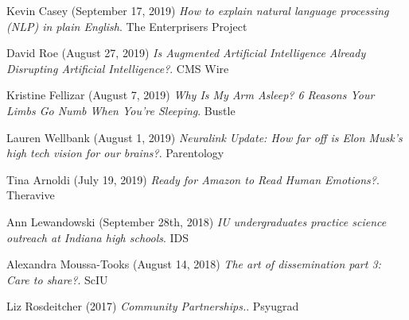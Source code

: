 \documentclass[10pt]{cooperCV2}
\begin{document}
\begin{etaremune}[itemindent=-1.5\bibhang, topsep=0pt,
				   itemsep=\bibsep,partopsep=0pt,parsep=0pt,leftmargin={\bibhang+\widthof{[999]}}]
	
    \item Kevin Casey (September 17, 2019) \textit{How to explain natural language processing (NLP) in plain English}. The Enterprisers Project
     
	
    \item David Roe (August 27, 2019) \textit{Is Augmented Artificial Intelligence Already Disrupting Artificial Intelligence?}. CMS Wire
     
	
    \item Kristine Fellizar (August 7, 2019) \textit{Why Is My Arm Asleep? 6 Reasons Your Limbs Go Numb When You're Sleeping}. Bustle
     
	
    \item Lauren Wellbank (August 1, 2019) \textit{Neuralink Update: How far off is Elon Musk’s high tech vision for our brains?}. Parentology
     
	
    \item Tina Arnoldi (July 19, 2019) \textit{Ready for Amazon to Read Human Emotions?}. Theravive
     
	
    \item Ann Lewandowski (September 28th, 2018) \textit{IU undergraduates practice science outreach at Indiana high schools}. IDS
     
	
    \item Alexandra Moussa-Tooks (August 14, 2018) \textit{The art of dissemination part 3: Care to share?}. ScIU
     
	
    \item Liz Rosdeitcher (2017) \textit{Community Partnerships.}. Psyugrad
     
	


\end{etaremune}




%
%






%	
\end{document}
